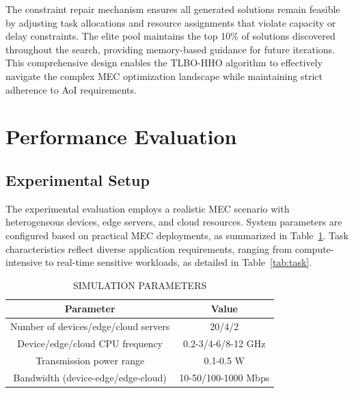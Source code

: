 \documentclass[conference]{IEEEtran}
\begin{document}
The constraint repair mechanism ensures all generated solutions remain feasible by adjusting task allocations and resource assignments that violate capacity or delay constraints. The elite pool maintains the top 10\% of solutions discovered throughout the search, providing memory-based guidance for future iterations. This comprehensive design enables the TLBO-HHO algorithm to effectively navigate the complex MEC optimization landscape while maintaining strict adherence to AoI requirements.

\section{Performance Evaluation}
\subsection{Experimental Setup}
The experimental evaluation employs a realistic MEC scenario with heterogeneous devices, edge servers, and cloud resources. System parameters are configured based on practical MEC deployments, as summarized in Table~\ref{tab:system}. Task characteristics reflect diverse application requirements, ranging from compute-intensive to real-time sensitive workloads, as detailed in Table~\ref{tab:task}.

\begin{table}[!t]
\small
\centering
\caption{SIMULATION PARAMETERS}
\label{tab:system}
\begin{tabular}{|c|c|}
\hline
\textbf{Parameter} & \textbf{Value} \\
\hline
Number of devices/edge/cloud servers & 20/4/2 \\
Device/edge/cloud CPU frequency & 0.2-3/4-6/8-12 GHz \\
Transmission power range & 0.1-0.5 W \\
Bandwidth (device-edge/edge-cloud) & 10-50/100-1000 Mbps \\
\hline
\end{tabular}
\end{table}

\begin{table}[!t]
  \scriptsize
  \setlength{\tabcolsep}{4pt}
  \centering
  \caption{Task Type Distribution and Characteristics}
  \label{tab:task}
\end{table}
\end{document}
